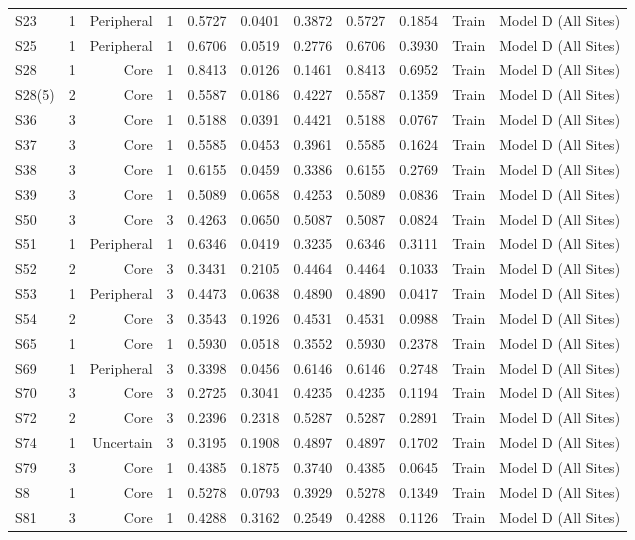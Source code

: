 {\begin{longtable}{lrrrrrrrrrr}
  S23 & 1 & Peripheral & 1 & 0.5727 & 0.0401 & 0.3872 & 0.5727 & 0.1854 & Train & Model D (All Sites) \\
  S25 & 1 & Peripheral & 1 & 0.6706 & 0.0519 & 0.2776 & 0.6706 & 0.3930 & Train & Model D (All Sites) \\
  S28 & 1 & Core & 1 & 0.8413 & 0.0126 & 0.1461 & 0.8413 & 0.6952 & Train & Model D (All Sites) \\
  S28(5) & 2 & Core & 1 & 0.5587 & 0.0186 & 0.4227 & 0.5587 & 0.1359 & Train & Model D (All Sites) \\
  S36 & 3 & Core & 1 & 0.5188 & 0.0391 & 0.4421 & 0.5188 & 0.0767 & Train & Model D (All Sites) \\
  S37 & 3 & Core & 1 & 0.5585 & 0.0453 & 0.3961 & 0.5585 & 0.1624 & Train & Model D (All Sites) \\
  S38 & 3 & Core & 1 & 0.6155 & 0.0459 & 0.3386 & 0.6155 & 0.2769 & Train & Model D (All Sites) \\
  S39 & 3 & Core & 1 & 0.5089 & 0.0658 & 0.4253 & 0.5089 & 0.0836 & Train & Model D (All Sites) \\
  S50 & 3 & Core & 3 & 0.4263 & 0.0650 & 0.5087 & 0.5087 & 0.0824 & Train & Model D (All Sites) \\
  S51 & 1 & Peripheral & 1 & 0.6346 & 0.0419 & 0.3235 & 0.6346 & 0.3111 & Train & Model D (All Sites) \\
  S52 & 2 & Core & 3 & 0.3431 & 0.2105 & 0.4464 & 0.4464 & 0.1033 & Train & Model D (All Sites) \\
  S53 & 1 & Peripheral & 3 & 0.4473 & 0.0638 & 0.4890 & 0.4890 & 0.0417 & Train & Model D (All Sites) \\
  S54 & 2 & Core & 3 & 0.3543 & 0.1926 & 0.4531 & 0.4531 & 0.0988 & Train & Model D (All Sites) \\
  S65 & 1 & Core & 1 & 0.5930 & 0.0518 & 0.3552 & 0.5930 & 0.2378 & Train & Model D (All Sites) \\
  S69 & 1 & Peripheral & 3 & 0.3398 & 0.0456 & 0.6146 & 0.6146 & 0.2748 & Train & Model D (All Sites) \\
  S70 & 3 & Core & 3 & 0.2725 & 0.3041 & 0.4235 & 0.4235 & 0.1194 & Train & Model D (All Sites) \\
  S72 & 2 & Core & 3 & 0.2396 & 0.2318 & 0.5287 & 0.5287 & 0.2891 & Train & Model D (All Sites) \\
  S74 & 1 & Uncertain & 3 & 0.3195 & 0.1908 & 0.4897 & 0.4897 & 0.1702 & Train & Model D (All Sites) \\
  S79 & 3 & Core & 1 & 0.4385 & 0.1875 & 0.3740 & 0.4385 & 0.0645 & Train & Model D (All Sites) \\
  S8 & 1 & Core & 1 & 0.5278 & 0.0793 & 0.3929 & 0.5278 & 0.1349 & Train & Model D (All Sites) \\
  S81 & 3 & Core & 1 & 0.4288 & 0.3162 & 0.2549 & 0.4288 & 0.1126 & Train & Model D (All Sites) \\
\end{longtable}
}
